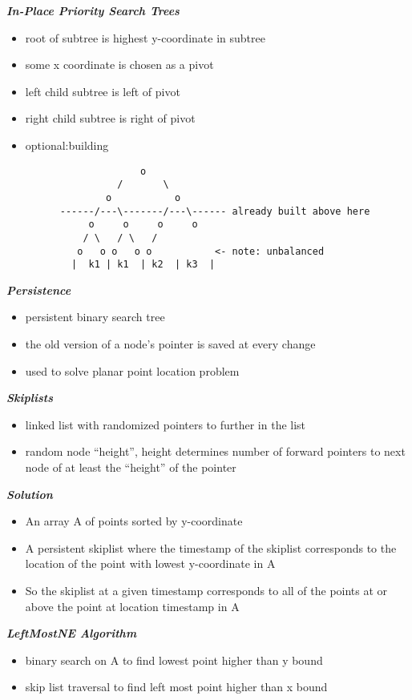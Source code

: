 \documentclass{article}
\begin{document}
{\bf\em In-Place Priority Search Trees}

\begin{itemize}
\item
  root of subtree is highest y-coordinate in subtree
\item
  some x coordinate is chosen as a pivot
\item
  left child subtree is left of pivot
\item
  right child subtree is right of pivot
\item
  optional:building\\
\begin{verbatim}
	                o
	            /       \ 
	          o           o
	  ------/---\-------/---\------ already built above here
	       o     o     o     o
	      / \   / \   /
	     o   o o   o o           <- note: unbalanced
	    |  k1 | k1  | k2  | k3  |
\end{verbatim}
\end{itemize}

{\bf\em Persistence}

\begin{itemize}
\item
  persistent binary search tree
\item
  the old version of a node's pointer is saved at every change
\item
  used to solve planar point location problem
\end{itemize}

{\bf\em Skiplists}

\begin{itemize}
\item
  linked list with randomized pointers to further in the list
\item
  random node ``height'', height determines number of forward pointers
  to next node of at least the ``height'' of the pointer
\end{itemize}

{\bf\em Solution}

\begin{itemize}
\item
  An array A of points sorted by y-coordinate
\item
  A persistent skiplist where the timestamp of the skiplist corresponds to the
  location of the point with lowest y-coordinate in A
\item
  So the skiplist at a given timestamp corresponds to all of the points at or
  above the point at location timestamp in A
\end{itemize}

{\bf\em LeftMostNE Algorithm}

\begin{itemize}
\item
  binary search on A to find lowest point higher than y bound
\item
  skip list traversal to find left most point higher than x bound
\end{itemize}
\end{document}
